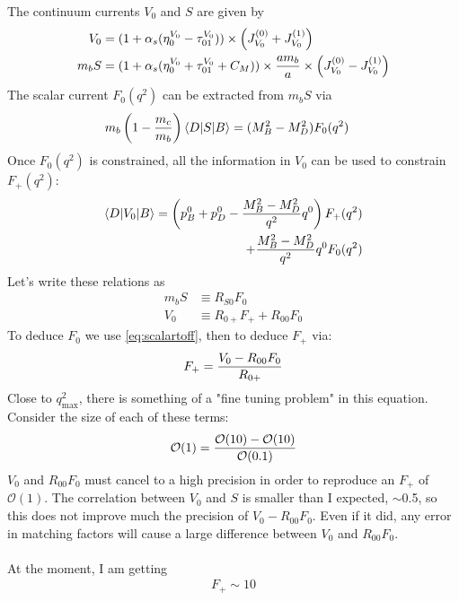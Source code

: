 \documentclass[a4paper,10pt]{article}
\numberwithin{equation}{section}
\begin{document}
The continuum currents $V_0$ and $S$ are given by
\begin{align}
        V_0 &= (1 + \alpha_s (\eta_{0}^{V_0} - \tau_{01}^{V_0})) \times \left( J_{V_0}^{(0)} + J_{V_0}^{(1)} \right) \\  
        m_b S &= (1 + \alpha_s (\eta_{0}^{V_0} + \tau_{01}^{V_0} + C_M))\times {am_b\over a} \times \left( J_{V_0}^{(0)} - J_{V_0}^{(1)} \right)
\end{align}
The scalar current $F_0(q^2)$ can be extracted from $m_b S$ via
\begin{align}
        m_b \left(1 - {m_c\over m_b} \right) \langle D | S | B \rangle &= ( M_B^2 - M_D^2 ) F_0(q^2)
\end{align}
Once $F_0(q^2)$ is constrained, all the information in $V_0$ can be used to constrain $F_+(q^2)$:
\begin{align}
        \langle D | V_0 | B \rangle = \left( p_B^0 + p_D^0 - {{M_B^2-M_D^2}\over q^2} q^0 \right) F_+(q^2) \\
                + {{M_B^2-M_D^2}\over q^2} q^0 F_0(q^2)
                \nonumber
\end{align}
Let's write these relations as
\begin{align}
        \label{eq:scalartoff}
        m_b S & \equiv R_{S0} F_0 \\
        V_0 & \equiv R_{0+} F_+ + R_{00} F_0
\end{align}
To deduce $F_0$ we use \eqref{eq:scalartoff}, then to deduce $F_+$ via:
\begin{align}
        F_+ = {V_0 - R_{00} F_0 \over R_{0+}}
\end{align}
Close to $q^2_{\text{max}}$, there is something of a "fine tuning problem" in this equation. Consider the size of each of these terms:
\begin{align}
        \mathcal{O}(1) = {\mathcal{O}(10) - \mathcal{O}(10) \over \mathcal{O}(0.1)}
\end{align}
$V_0$ and $R_{00}F_0$ must cancel to a high precision in order to reproduce an $F_+$ of $\mathcal{O}(1)$.  The correlation between $V_0$ and $S$ is smaller than I expected, $\sim$0.5, so this does not improve much the precision of $V_0-R_{00}F_0$. Even if it did, any error in matching factors will cause a large difference between $V_0$ and $R_{00} F_0$.
\\ \\
At the moment, I am getting
\begin{align}
        F_+ \sim 10
\end{align}
\end{document}
